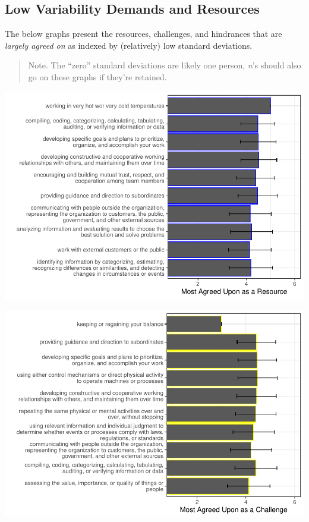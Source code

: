 \documentclass[
  english,
  man]{apa6}
\begin{document}
\hypertarget{low-variability-demands-and-resources}{%
\subsection{Low Variability Demands and Resources}\label{low-variability-demands-and-resources}}

The below graphs present the resources, challenges, and hindrances that are \emph{largely agreed on} as indexed by (relatively) low standard deviations.

\begin{quote}
Note. The \enquote{zero} standard deviations are likely one person, \emph{n}'s should also go on these graphs if they're retained.
\end{quote}

\includegraphics{JDR_3_Crosswalk_files/figure-latex/resourceslowsd-1.pdf}

\includegraphics{JDR_3_Crosswalk_files/figure-latex/challengesagree-1.pdf}
\end{document}
